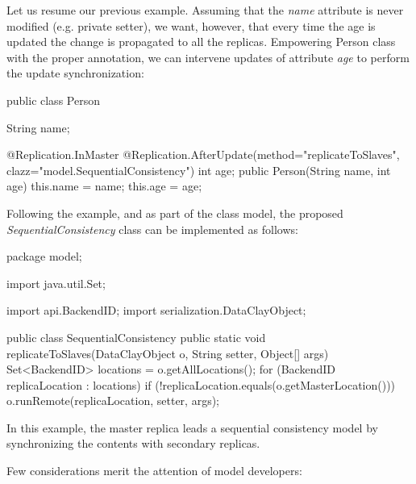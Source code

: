 Let us resume our previous example. Assuming that the \textit{name} attribute is never modified (e.g. private setter), we want, however, that every time the age is updated the change is propagated to all the replicas. Empowering Person class with the proper annotation, we can intervene updates of attribute \textit{age} to perform the update synchronization:

\begin{tBox}
\begin{java}
public class Person {
  String name;

  @Replication.InMaster
  @Replication.AfterUpdate(method="replicateToSlaves",
                                    clazz="model.SequentialConsistency")
  int age;
  public Person(String name, int age) {
    this.name = name;
    this.age = age;
  }
}
\end{java}
\end{tBox}

Following the example, and as part of the class model, the proposed \textit{SequentialConsistency} class can be implemented as follows:

\begin{tBox}
\begin{java}
package model;

import java.util.Set;

import api.BackendID;
import serialization.DataClayObject;

public class SequentialConsistency {
  public static void replicateToSlaves(DataClayObject o, String setter, Object[] args) {
    Set<BackendID> locations = o.getAllLocations();
    for (BackendID replicaLocation : locations) {
      if (!replicaLocation.equals(o.getMasterLocation())) {
         o.runRemote(replicaLocation, setter, args);
      }
    }
  }
}
\end{java}
\end{tBox}

In this example, the master replica leads a sequential consistency model by synchronizing the contents with secondary replicas. 

Few considerations merit the attention of model developers:

